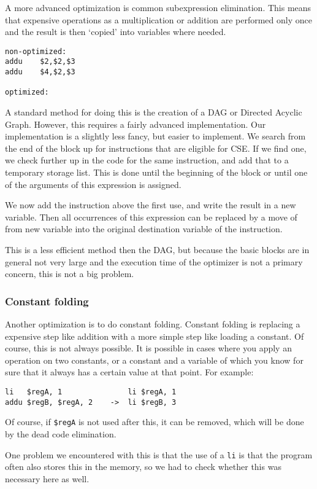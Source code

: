 \documentclass[10pt,a4paper]{article}
\begin{document}
A more advanced optimization is common subexpression elimination. This means
that expensive operations as a multiplication or addition are performed only
once and the result is then `copied' into variables where needed.
\begin{verbatim}
non-optimized:
addu	$2,$2,$3
addu	$4,$2,$3

optimized:

\end{verbatim}

A standard method for doing this is the creation of a DAG or Directed Acyclic
Graph. However, this requires a fairly advanced implementation. Our
implementation is a slightly less fancy, but easier to implement.
We search from the end of the block up for instructions that are eligible for
CSE. If we find one, we check further up in the code for the same instruction,
and add that to a temporary storage list. This is done until the beginning of
the block or until one of the arguments of this expression is assigned.

We now add the instruction above the first use, and write the result in a new
variable. Then all occurrences of this expression can be replaced by a move of
from new variable into the original destination variable of the instruction.

This is a less efficient method then the DAG, but because the basic blocks are
in general not very large and the execution time of the optimizer is not a
primary concern, this is not a big problem.

\subsubsection*{Constant folding}

Another optimization is to do constant folding. Constant folding is replacing
a expensive step like addition with a more simple step like loading a constant.
Of course, this is not always possible. It is possible in cases where you apply
an operation on two constants, or a constant and a variable of which you know
for sure that it always has a certain value at that point. For example:
\begin{verbatim}
li   $regA, 1               li $regA, 1
addu $regB, $regA, 2    ->  li $regB, 3
\end{verbatim}
Of course, if \texttt{\$regA} is not used after this, it can be removed, which
will be done by the dead code elimination.

One problem we encountered with this is that the use of a \texttt{li} is that
the program often also stores this in the memory, so we had to check whether
this was necessary here as well.
\end{document}
